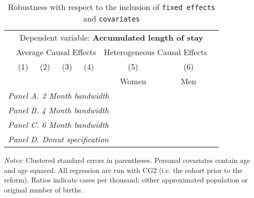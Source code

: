  \begin{table}[H] \begin{threeparttable} \centering \caption{Robustness with respect to the inclusion of \texttt{fixed effects} and \texttt{covariates}} {\def\sym#1{\ifmmode^{#1}\else\(^{#1}\)\fi} \begin{tabular}{l*{7}{c}} \toprule & \multicolumn{6}{c}{Dependent variable: \textbf{Accumulated length of stay}} \\ \cmidrule(lr){2-7}
            &\multicolumn{4}{c}{Average Causal Effects}         &\multicolumn{2}{c}{Heterogeneous Causal Effects}\\\cmidrule(lr){2-5}\cmidrule(lr){6-7}
            &\multicolumn{1}{c}{(1)}&\multicolumn{1}{c}{(2)}&\multicolumn{1}{c}{(3)}&\multicolumn{1}{c}{(4)}&\multicolumn{1}{c}{(5)}&\multicolumn{1}{c}{(6)}\\
            &\multicolumn{1}{c}{}&\multicolumn{1}{c}{}&\multicolumn{1}{c}{}&\multicolumn{1}{c}{}&\multicolumn{1}{c}{Women}&\multicolumn{1}{c}{Men}\\
\midrule
 \multicolumn{7}{l}{\emph{Panel A. 2 Month bandwidth}} \\    \midrule\multicolumn{7}{l}{\emph{Panel B. 4 Month bandwidth}} \\    \midrule\multicolumn{7}{l}{\emph{Panel C. 6 Month bandwidth}} \\    \midrule\multicolumn{7}{l}{\emph{Panel D. Donut specification}} \\    \midrule  
\bottomrule \end{tabular} } \begin{tablenotes} \item \scriptsize \emph{Notes:} Clustered standard errors in parentheses. Personal covariates contain age and age squared. All regression are run with CG2 (i.e. the cohort prior to the reform). Ratios indicate cases per thousand; either approximated population or original number of births. \end{tablenotes} \end{threeparttable} \end{table} 
